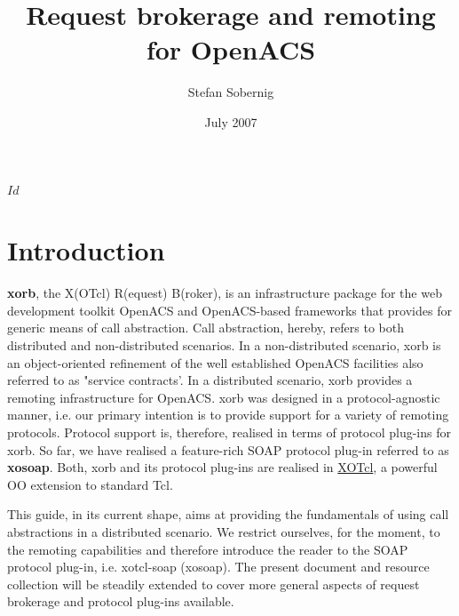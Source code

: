 

\makeindex
  
  \svnInfo $Id$
\title{Request brokerage and remoting for OpenACS}
\author{Stefan Sobernig}
\date{July 2007}
\maketitle

     \section{Introduction}
        \textbf{xorb}, the X(OTcl) R(equest) B(roker), is an 
infrastructure package for the web development toolkit OpenACS and OpenACS-based frameworks that 
provides for generic means of call abstraction.  Call abstraction, hereby, refers to both distributed and 
non-distributed scenarios. In a non-distributed scenario, xorb is an object-oriented refinement of the well 
established OpenACS facilities also referred to as "service contracts'. In a distributed scenario, xorb 
provides a remoting infrastructure for OpenACS. xorb was designed in a protocol-agnostic manner, i.e. 
our primary intention is to provide support for a variety of remoting protocols. Protocol support is, 
therefore, realised in terms of protocol plug-ins for xorb. So far, we have realised a feature-rich SOAP 
protocol plug-in referred to as \textbf{xosoap}. Both, xorb and its protocol plug-ins are realised in \href{http://media.wu-wien.ac.at/}{XOTcl}, a powerful OO extension to standard Tcl.

This guide, in its current shape, aims at providing the fundamentals of using call abstractions in a 
distributed scenario. We restrict ourselves, for the moment, to the remoting capabilities and therefore 
introduce the reader to the SOAP protocol plug-in, i.e. xotcl-soap (xosoap). The present document and 
resource collection will be steadily extended to cover more general aspects of request brokerage and 
protocol plug-ins available.
